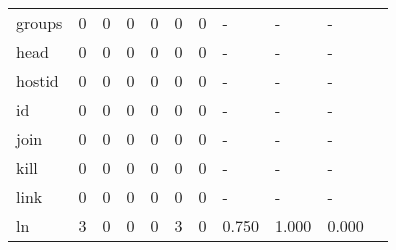 \begin{longtable}{lp{1.10cm}p{1.10cm}p{1.10cm}p{1.10cm}p{1.10cm}p{1.10cm}p{1.10cm}p{1.10cm}p{1.10cm}p{1.10cm}}
groups    &                      0 &                                  0 &                                 0 &                                0 &                                 0 &                               0 &                              - &                                     - &                                   - \\
head      &                      0 &                                  0 &                                 0 &                                0 &                                 0 &                               0 &                              - &                                     - &                                   - \\
hostid    &                      0 &                                  0 &                                 0 &                                0 &                                 0 &                               0 &                              - &                                     - &                                   - \\
id        &                      0 &                                  0 &                                 0 &                                0 &                                 0 &                               0 &                              - &                                     - &                                   - \\
join      &                      0 &                                  0 &                                 0 &                                0 &                                 0 &                               0 &                              - &                                     - &                                   - \\
kill      &                      0 &                                  0 &                                 0 &                                0 &                                 0 &                               0 &                              - &                                     - &                                   - \\
link      &                      0 &                                  0 &                                 0 &                                0 &                                 0 &                               0 &                              - &                                     - &                                   - \\
ln        &                      3 &                                  0 &                                 0 &                                0 &                                 3 &                               0 &                          0.750 &                                 1.000 &                               0.000 \\

\end{longtable}
